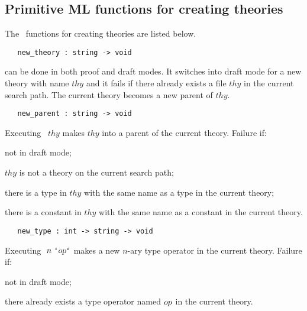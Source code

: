 \subsection{Primitive ML functions for creating theories}
\label{theoryprims}

The \ML\ functions for creating theories are listed below.

\begin{boxed}
\begin{verbatim}
   new_theory : string -> void
\end{verbatim}\end{boxed}

\noindent {} can be done in both
proof and
draft modes. It
switches into draft mode for a new theory with name $thy$ and it fails if
there already exists a file $thy$ in the current search path. The
current theory becomes a new parent of $thy$.


\begin{boxed}
\begin{verbatim}
   new_parent : string -> void
\end{verbatim}\end{boxed}


\noindent Executing \ $thy$ makes $thy$ into
a parent
of the current theory. Failure if:
\begin{myenumerate}
\item not in draft mode;
\item $thy$ is not a theory on the current search path;
\item there is a type in $thy$ with the same
name as a type in the current theory;
\item there is a constant in $thy$ with the same
name as a constant in the current theory.
\end{myenumerate}


\begin{boxed}
\begin{verbatim}
   new_type : int -> string -> void
\end{verbatim}\end{boxed}


\noindent Executing $\ n\ \ml{`\ty{op}`}$ makes 
a new $n$-ary type operator in the current theory.
Failure if:
\begin{myenumerate}
\item not in draft mode;
\item there already exists a type operator named ${\sl op}$ in the current
theory.
\end{myenumerate}


